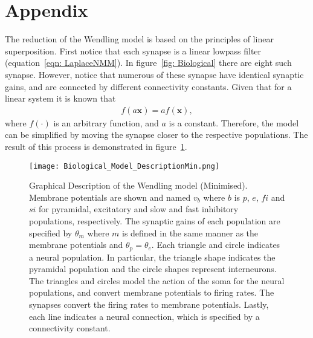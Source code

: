 \section{Appendix}
\label{sec: AppendixA}

The reduction of the Wendling model is based on the principles of linear superposition. First notice that each synapse is a linear lowpass filter (equation~\ref{eqn: LaplaceNMM}). In figure~\ref{fig: Biological} there are eight such synapse. However, notice that numerous of these synapse have identical synaptic gains, and are connected by different connectivity constants. Given that for a linear system it is known that
\begin{align}
f(a\mathbf{x}) = af(\mathbf{x}),
\end{align} where $f(\cdot)$ is an arbitrary function, and $a$ is a constant. Therefore, the model can be simplified by moving the synapse closer to the respective populations. The result of this process is demonstrated in figure~\ref{fig: BiologicalMin}.

\begin{figure}  %
	\centering
		\texttt{[image: Biological\_Model\_DescriptionMin.png]}
	\caption{Graphical Description of the Wendling model (Minimised). Membrane potentials are shown and named $v_{b}$ where $b$ is $p$, $e$, $fi$ and $si$ for pyramidal, excitatory and slow and fast inhibitory populations, respectively. The synaptic gains of each population are specified by $\theta_{m}$ where $m$ is defined in the same manner as the membrane potentials and $\theta_{p}=\theta_{e}$. Each triangle and circle indicates a neural population. In particular, the triangle shape indicates the pyramidal population and the circle shapes represent interneurons. The triangles and circles model the action of the soma for the neural populations, and convert membrane potentials to firing rates. The synapses convert the firing rates to membrane potentials. Lastly, each line indicates a neural connection, which is specified by a connectivity constant.}
	\label{fig: BiologicalMin}
\end{figure}%

